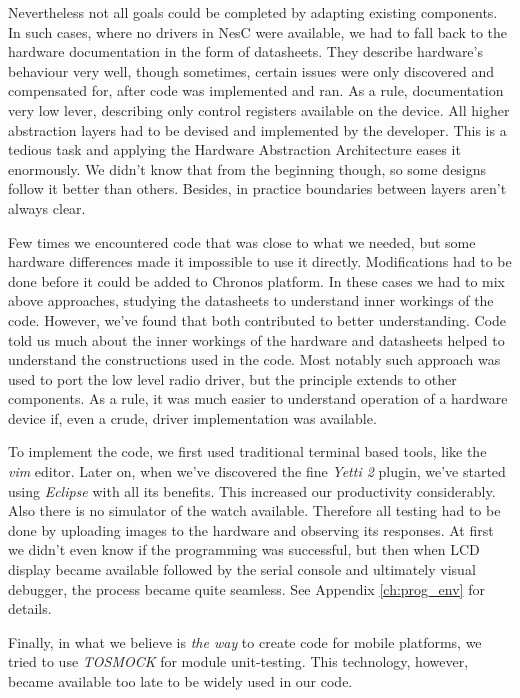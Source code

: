 Nevertheless not all goals could be completed by adapting existing components. In such cases, where no drivers in NesC were available, we had to fall back to the hardware documentation in the form of datasheets. They describe hardware's behaviour very well, though sometimes, certain issues were only discovered and compensated for, after code was implemented and ran. As a rule, documentation very low lever, describing only control registers available on the device. All higher abstraction layers had to be devised and implemented by the developer. This is a tedious task and applying the Hardware Abstraction Architecture eases it enormously. We didn't know that from the beginning though, so some designs follow it better than others. Besides, in practice boundaries between layers aren't always clear.

Few times we encountered code that was close to what we needed, but some hardware differences made it impossible to use it directly. Modifications had to be done before it could be added to Chronos platform. In these cases we had to mix above approaches, studying the datasheets to understand inner workings of the code. However, we've found that both contributed to better understanding. Code told us much about the inner workings of the hardware and datasheets helped to understand the constructions used in the code. Most notably such approach was used to port the low level radio driver, but the principle extends to other components. As a rule, it was much easier to understand operation of a hardware device if, even a crude, driver implementation was available.

To implement the code, we first used traditional terminal based tools, like the \emph{vim} editor. Later on, when we've discovered the fine \emph{Yetti 2} plugin, we've started using \emph{Eclipse} with all its benefits. This increased our productivity considerably. Also there is no simulator of the watch available. Therefore all testing had to be done by uploading images to the hardware and observing its responses. At first we didn't even know if the programming was successful, but then when LCD display became available followed by the serial console and ultimately visual debugger, the process became quite seamless. See Appendix \ref{ch:prog_env} for details.

Finally, in what we believe is \emph{the way} to create code for mobile platforms, we tried to use \emph{TOSMOCK} for module unit-testing. This technology, however, became available too late to be widely used in our code.

